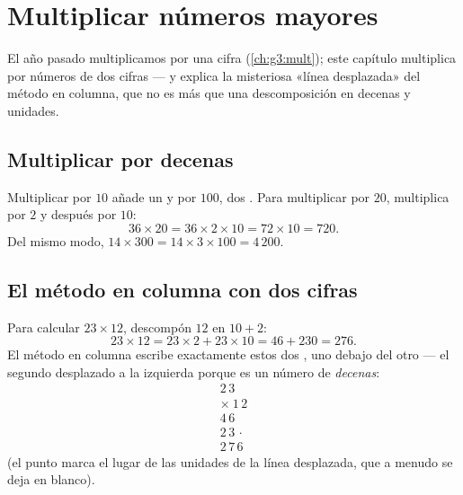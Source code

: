 \chapter{Multiplicar números mayores}\label{ch:g4:mult}

El año pasado multiplicamos por una cifra (\cref{ch:g3:mult}); este capítulo
multiplica por números de dos cifras --- y explica la misteriosa
«línea desplazada» del método en columna, que no es más que una
descomposición en decenas y unidades.

\section{Multiplicar por decenas}

\begin{proposition}\label{prop:g4:mult:tens}
Multiplicar por $10$ añade un  y por $100$, dos . Para multiplicar
por $20$, multiplica por $2$ y después por $10$:
\[
36 \times 20 = 36 \times 2 \times 10 = 72 \times 10 = 720 .
\]
Del mismo modo, $14 \times 300 = 14 \times 3 \times 100 = 4\,200$.
\end{proposition}
\admitted

\section{El método en columna con dos cifras}

\begin{example}\label{ex:g4:mult:why}
Para calcular $23 \times 12$, descompón $12$ en $10 + 2$:
\[
23 \times 12 = 23 \times 2 + 23 \times 10 = 46 + 230 = 276 .
\]
El método en columna escribe exactamente estos dos , uno debajo del
otro --- el segundo desplazado a la izquierda porque es un número de
\emph{decenas}:
\[
\begin{array}{r}
2\,3 \\
\times\ 1\,2 \\
\hline
4\,6 \\
2\,3\,\cdot \\
\hline
2\,7\,6
\end{array}
\]
(el punto marca el lugar de las unidades de la línea desplazada, que a menudo se deja
en blanco).
\end{example}


